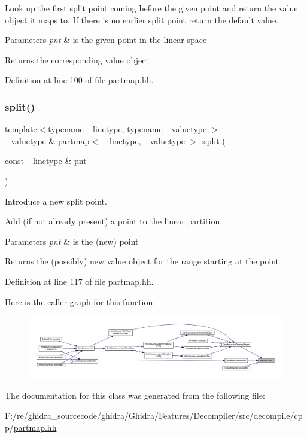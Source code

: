 Look up the first split point coming before the given point and return the value object it maps to. If there is no earlier split point return the default value. 
\begin{DoxyParams}{Parameters}
{\em pnt} & is the given point in the linear space \\
\hline
\end{DoxyParams}
\begin{DoxyReturn}{Returns}
the corresponding value object 
\end{DoxyReturn}


Definition at line 100 of file partmap.\+hh.

\mbox{\label{classpartmap_addca2efbfee018ee367de754e7772305}} 
\subsubsection{\texorpdfstring{split()}{split()}}
{\footnotesize\ttfamily template$<$typename \+\_\+linetype, typename \+\_\+valuetype $>$ \\
\+\_\+valuetype \& \mbox{\hyperlink{classpartmap}{partmap}}$<$ \+\_\+linetype, \+\_\+valuetype $>$\+::split (\begin{DoxyParamCaption}\item[{const \+\_\+linetype \&}]{pnt }\end{DoxyParamCaption})}



Introduce a new split point. 

Add (if not already present) a point to the linear partition. 
\begin{DoxyParams}{Parameters}
{\em pnt} & is the (new) point \\
\hline
\end{DoxyParams}
\begin{DoxyReturn}{Returns}
the (possibly) new value object for the range starting at the point 
\end{DoxyReturn}


Definition at line 117 of file partmap.\+hh.

Here is the caller graph for this function\+:
\nopagebreak
\begin{figure}[H]
\begin{center}
\leavevmode
\includegraphics[width=350pt]{classpartmap_addca2efbfee018ee367de754e7772305_icgraph}
\end{center}
\end{figure}


The documentation for this class was generated from the following file\+:\begin{DoxyCompactItemize}
\item 
F\+:/re/ghidra\+\_\+sourcecode/ghidra/\+Ghidra/\+Features/\+Decompiler/src/decompile/cpp/\mbox{\hyperlink{partmap_8hh}{partmap.\+hh}}\end{DoxyCompactItemize}
